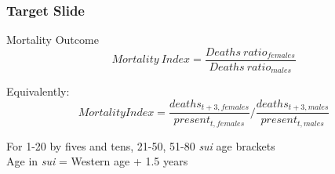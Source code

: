 {
\begin{frame}[plain]
\end{frame}
}



\begin{frame}[label=target-slide]
\frametitle{Target Slide \hyperlink{source-slide}{}}
\begin{block}{Mortality Outcome}
\begin{equation}
Mortality \ Index = \frac{Deaths \ ratio_{females}}{ Deaths \ ratio_{males}}
\end{equation}
\end{block}

\begin{block}{Equivalently:}
\begin{equation}
Mortality Index = \frac{deaths_{t+3,females}}{present_{t,females}}\Big/\frac{deaths_{t+3,males}}{present_{t,males}} 
\end{equation}
\end{block}

For 1-20 by fives and tens, 21-50, 51-80 \emph{sui} age brackets\\
{\tiny Age in \emph{sui} = Western age + 1.5 years}
\end{frame}

